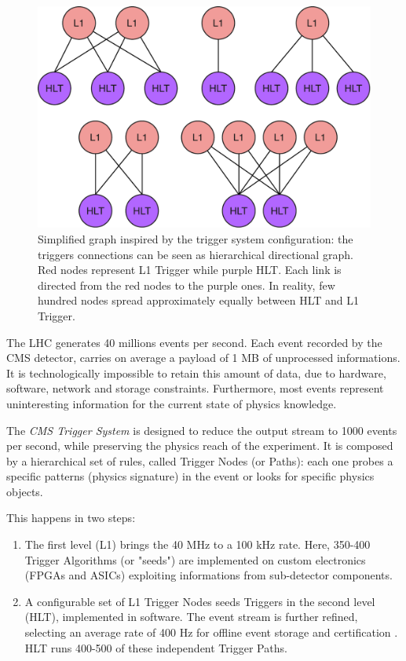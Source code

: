 \begin{figure}
    \centerline{
        \includegraphics[width=0.5\paperwidth]{figures/triggers.pdf}}
    \caption{Simplified graph inspired by the trigger system configuration: the triggers connections can be seen as hierarchical directional graph. Red nodes represent L1 Trigger while purple HLT. Each link is directed from the red nodes to the purple ones. In reality, few hundred nodes spread approximately equally between HLT and L1 Trigger. \cite{adpol-cvae}}
    \label{fig:triggers}
\end{figure}


The LHC generates 40 millions events per second. Each event recorded by the CMS detector, carries on average a payload of 1 MB of unprocessed informations. It is technologically impossible to retain this amount of data, due to hardware, software, network and storage constraints. Furthermore, most events represent uninteresting information for the current state of physics knowledge.

The \textit{CMS Trigger System} is designed to reduce the output stream to 1000 events per second, while preserving the physics reach of the experiment.
It is composed by a hierarchical set of rules, called Trigger Nodes (or Paths): each one probes a specific patterns (physics signature) in the event or looks for specific physics objects.

This happens in two steps:

\begin{enumerate}

    \item The first level (L1) \cite{Bayatyan:706847} brings the 40 MHz to a 100 kHz rate. Here, 350-400 \cite{Sirunyan:2721198} Trigger Algorithms (or "seeds") are implemented on custom electronics (FPGAs and ASICs) exploiting informations from sub-detector components.

    \item A configurable set of L1 Trigger Nodes seeds Triggers in the second level (HLT), implemented in software. The event stream is further refined, selecting an average rate of 400 Hz for offline event storage and certification \cite{Khachatryan_2017}. HLT runs 400-500 of these independent Trigger Paths.

\end{enumerate}


